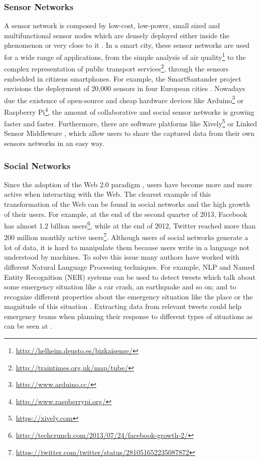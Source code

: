 \subsubsection{Sensor Networks}\label{sensor_networks}

A sensor network is composed by low-cost, low-power, small sized and multifunctional sensor nodes which are densely deployed either inside the phenomenon or very close to it \cite{akyildiz_survey_2002}. In a smart city, these sensor networks are used for a wide range of applications, from the simple analysis of air quality\footnote{\url{http://helheim.deusto.es/bizkaisense/}} to the complex representation of public transport services\footnote{\url{http://traintimes.org.uk/map/tube/}}, through the sensors embedded in citizens smartphones. For example, the SmartSantander project envisions the deployment of 20,000 sensors in four European cities \cite{sanchez_smartsantander:_2011}. Nowadays due the existence of open-source and cheap hardware devices like Arduino\footnote{\url{http://www.arduino.cc/}} or Raspberry Pi\footnote{\url{http://www.raspberrypi.org/}}, the amount of collaborative and social sensor networks is growing faster and faster. Furthermore, there are software platforms like Xively\footnote{\url{https://xively.com}} or Linked Sensor Middleware \cite{le-phuoc_linked_2011}, which allow users to share the captured data from their own sensors networks in an easy way.

\subsubsection{Social Networks}\label{social_networks}

Since the adoption of the Web 2.0 paradigm \cite{oreilly_what_2007}, users have become more and more active when interacting with the Web. The clearest example of this transformation of the Web can be found in social networks and the high growth of their users. For example, at the end of the second quarter of 2013, Facebook has almost 1.2 billion users\footnote{\url{http://techcrunch.com/2013/07/24/facebook-growth-2/}}, while at the end of 2012, Twitter reached more than 200 million monthly active users\footnote{\url{https://twitter.com/twitter/status/281051652235087872}}. Although users of social networks generate a lot of data, it is hard to manipulate them because users write in a language not understood by machines. To solve this issue many authors have worked with different Natural Language Processing techniques. For example, NLP and Named Entity Recognition (NER) systems \cite{maynard_named_2001} can be used to detect tweets which talk about some emergency situation like a car crash, an earthquake and so on; and to recognize different properties about the emergency situation like the place or the magnitude of this situation \cite{sixto_enable_????,martins_machine_2010}. Extracting data from relevant tweets could help emergency teams when planning their response to different types of situations as can be seen at \cite{abel_twitcident:_2012,vieweg_microblogging_2010,hughes_twitter_2009}.


